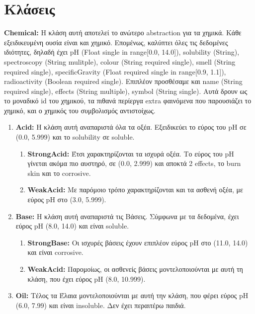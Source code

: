 \documentclass{article}
\newcommand{\lt}[1]{\latintext #1\greektext}
\newcommand{\blt}[1]{\lt{\textbf{#1}}}
\begin{document}
\section*{Κλάσεις}
    \blt{Chemical:} Η κλάση αυτή αποτελεί το ανώτερο \lt{abstraction} για τα χημικά. Κάθε εξειδικευμένη ουσία είναι και χημικό. Επομένως, καλύπτει όλες τις δεδομένες ιδιότητες, δηλαδή έχει \lt{pH (Float single in range[0.0, 14.0])}, \lt{solubility (String)}, \lt{spectroscopy (String mulitple)}, \lt{colour (String required single)}, \lt{smell (String required single)}, \lt{specificGravity (Float required single in range[0.9, 1.1])}, \lt{radioactivity (Boolean required single)}. Επιπλέον προσθέσαμε και \lt{name (String required single)}, \lt{effects (String multiple)}, \lt{symbol (String single)}. Αυτά δρουν ως το μοναδικό \lt{id} του χημικού, τα πιθανά περίεργα \lt{extra} φαινόμενα που παρουσιάζει το χημικό, και ο χημικός του συμβολισμός αντιστοίχως.
    \begin{enumerate}
        \item \blt{Acid:} Η κλάση αυτή αναπαριστά όλα τα οξέα. Εξειδικεύει το εύρος του \lt{pH} σε (0.0, 5.999) και το \lt{solubility} σε \lt{soluble}.
        \begin{enumerate}
            \item \blt{StrongAcid:} Έτσι χαρακτηρίζονται τα ισχυρά οξέα. Το εύρος του \lt{pH} γίνεται ακόμα πιο αυστηρό, σε (0.0, 2.999) και αποκτά 2 \lt{effects}, το \lt{burn skin} και το \lt{corrosive}. 
            \item \blt{WeakAcid:} Με παρόμοιο τρόπο χαρακτηρίζονται και τα ασθενή οξέα, με εύρος \lt{pH} στο (3.0, 5.999).
        \end{enumerate}
        \item \blt{Base:} Η κλάση αυτή αναπαριστά τις Βάσεις. Σύμφωνα με τα δεδομένα, έχει εύρος \lt{pH} (8.0, 14.0) και είναι \lt{soluble}.
        \begin{enumerate}
            \item \blt{StrongBase:} Οι ισχυρές βάσεις έχουν επιπλέον εύρος \lt{pH} στο (11.0, 14.0) και είναι \lt{corrosive}.
            \item \blt{WeakAcid:} Παρομοίως, οι ασθενείς βάσεις μοντελοποιούνται με αυτή τη κλάση, που έχει εύρος \lt{pH} (8.0, 10.999).
        \end{enumerate}
        \item \blt{Oil:} Τέλος τα Έλαια μοντελοποιούνται με αυτή την κλάση, που φέρει εύρος \lt{pH} (6.0, 7.99) και είναι \lt{insoluble}. Δεν έχει περαιτέρω παιδιά.
    \end{enumerate}
    
\end{document}

